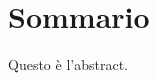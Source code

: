 \chapter*{Sommario}\thispagestyle{empty}    %
Questo è l'abstract.
\clearpage{\pagestyle{empty}\cleardoublepage}